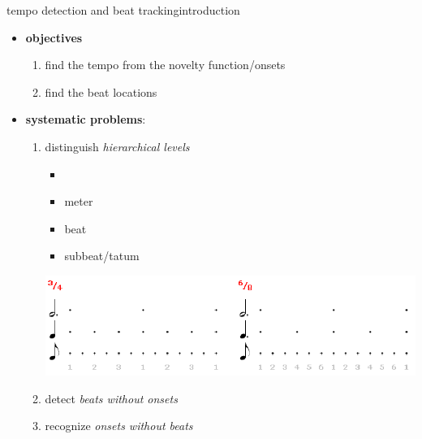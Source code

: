         \begin{frame}{tempo detection and beat tracking}{introduction}
            \begin{itemize}
                \item \textbf{objectives}
                    \begin{enumerate}
                        \item	find the tempo from the novelty function/onsets
                        \item	find the beat locations
                    \end{enumerate}
                \bigskip
                \item<2-> \textbf{systematic problems}:
                    \begin{enumerate}
                        \item	distinguish \textit{hierarchical levels}
                            \begin{itemize}
                                \item[]	
                                \item	meter
                                \item	beat
                                \item	subbeat/tatum
                            \end{itemize}
                            \vspace{-17mm}
                            \begin{flushright}
                                \includegraphics[scale=.25]{graph/periodiclevels}
                            \end{flushright}
                        \item<3->	detect \textit{beats without onsets}
                        \item<3->	recognize \textit{onsets without beats}
                    \end{enumerate}
            \end{itemize}
            
        \end{frame}
